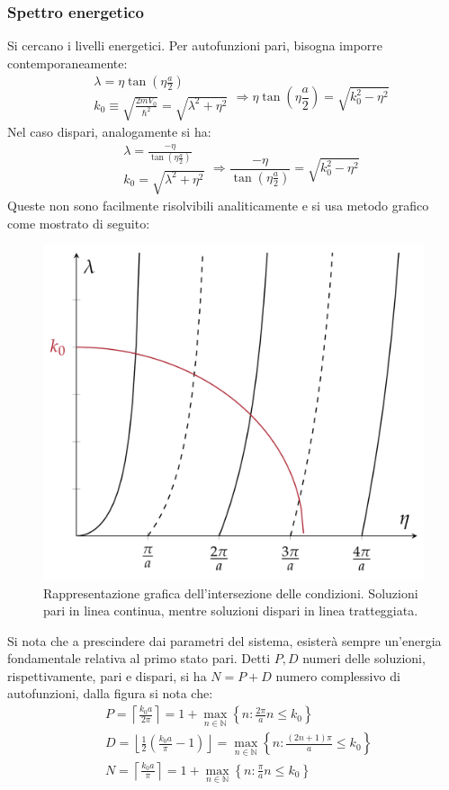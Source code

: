 \documentclass[10pt, a4paper]{scrartcl} %
\numberwithin{equation}{subsection}
\theoremstyle{style2}
\theoremstyle{style1}
\begin{document}
\subsubsection{Spettro energetico}
Si cercano i livelli energetici.
Per autofunzioni pari, bisogna imporre contemporaneamente:
\begin{equation}
	\begin{split}
		&\lambda  = \eta \tan \left(\eta \frac{a}{2}\right) \\
		&k_0 \equiv \sqrt{\frac{2m V_0}{\hbar ^2}} = \sqrt{\lambda ^2 + \eta^2} 
	\end{split} \Rightarrow \eta \tan\left(\eta \frac{a}{2}\right) = \sqrt{k_0^2 - \eta^2} 
\end{equation}
Nel caso dispari, analogamente si ha:
\begin{equation}
	\begin{split}
		&\lambda  = \frac{- \eta}{ \tan \left(\eta \frac{a}{2}\right) }\\
		&k_0 = \sqrt{\lambda ^2 + \eta^2} 
	\end{split} \Rightarrow \frac{-\eta}{\tan \left(\eta \frac{a}{2}\right) } = \sqrt{k_0^2 - \eta^2} 
\end{equation}
Queste non sono facilmente risolvibili analiticamente e si usa metodo grafico come mostrato di seguito:
\begin{figure}[h!]
	\centering
	\includegraphics[width=.4\columnwidth]{well-sol.png}
	\caption{Rappresentazione grafica dell'intersezione delle condizioni. Soluzioni pari in linea continua, mentre soluzioni dispari in linea tratteggiata.}
\end{figure}
Si nota che a prescindere dai parametri del sistema, esister\`a sempre un'energia fondamentale relativa al primo stato pari. 
Detti $P,D$ numeri delle soluzioni, rispettivamente, pari e dispari, si ha $N = P+D$ numero complessivo di autofunzioni, dalla figura si nota che:
\begin{equation}
	\begin{split}
		&P = \left\lceil \frac{k_0 a }{2\pi} \right\rceil = 1 + \max_{n \in \mathbb{N}}  \left\{ n : \frac{2\pi}{a}n \le k_0 \right\} \\
		& D = \left\lfloor \frac{1}{2}\left(\frac{k_0 a }{\pi}- 1\right)  \right\rfloor= \max_{n \in \mathbb{N}}  \left\{ n : \frac{(2n+1)\pi}{a} \le k_0 \right\} \\
		& N = \left\lceil \frac{k_0 a}{\pi} \right\rceil = 1+ \max_{n \in \mathbb{N}} \left\{ n : \frac{\pi}{a} n \le k_0 \right\} 
	\end{split}
\end{equation}
\end{document}
